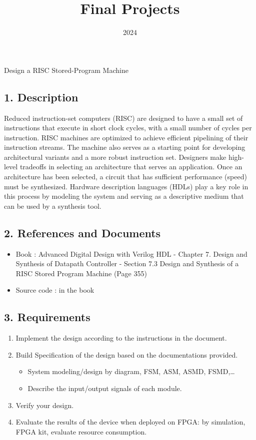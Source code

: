 \documentclass{vhdl-assignment}
\title{Final Projects}
\date{2024}
\begin{document}
\maketitle
\thispagestyle{fancy}

\begin{project}{Design a RISC Stored-Program Machine}
    \subsection*{1. Description}
    Reduced instruction-set computers (RISC) are designed to have a small set of instructions that execute in short clock cycles, with a small number of cycles per instruction.
    RISC machines are optimized to achieve efficient pipelining of their instruction streams.
    The machine also serves as a starting point for developing architectural variants and a more robust instruction set.
    Designers make high-level tradeoffs in selecting an architecture that serves an application.
    Once an architecture has been selected, a circuit that has sufficient performance (speed) must be synthesized.
    Hardware description languages (HDLs) play a key role in this process by modeling the system and serving as a descriptive medium that can be used by a synthesis tool.
    \subsection*{2. References and Documents}
    \begin{itemize}
        \item Book : Advanced Digital Design with Verilog HDL - Chapter 7. Design and Synthesis of Datapath Controller - Section 7.3 Design and Synthesis of a RISC Stored Program Machine (Page 355)
        \item Source code : in the book 
    \end{itemize}
    \subsection*{3. Requirements}
    \begin{enumerate}
        \item Implement the design according to the instructions in the document.
        \item Build Specification of the design based on the documentations provided.
        \begin{itemize}
            \item System modeling/design by diagram, FSM, ASM, ASMD, FSMD,\dots
            \item Describe the input/output signals of each module.
        \end{itemize}
        \item Verify your design.
        \item Evaluate the results of the device when deployed on FPGA: by simulation, FPGA kit, evaluate resource consumption.
    \end{enumerate}
\end{project}
\end{document}
